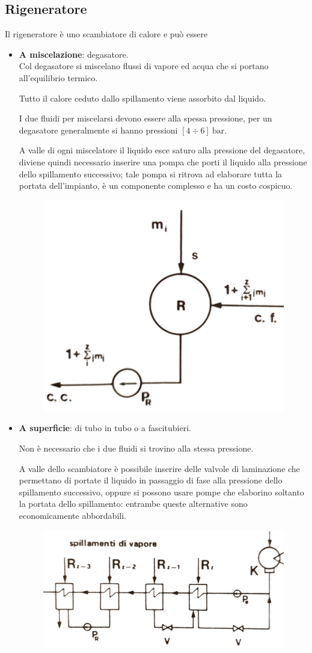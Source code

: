 \subsection{Rigeneratore}
\begin{adjustwidth}{2in}{}
	Il rigeneratore è uno scambiatore di calore e può essere 
	\begin{itemize}
		\item \textbf{A miscelazione}: degasatore.\\
		Col degasatore si miscelano flussi di vapore ed acqua che si portano all'equilibrio termico. 
		
		Tutto il calore ceduto dallo spillamento viene assorbito dal liquido. 
		
		I due fluidi per miscelarsi devono essere alla spessa pressione, per un degasatore generalmente si hanno pressioni $[4\div6]~\text{bar}$.
		
		A valle di ogni miscelatore il liquido esce saturo alla pressione del degasatore, diviene quindi necessario inserire una pompa che porti il liquido alla pressione dello spillamento successivo; tale pompa si ritrova ad elaborare tutta la portata dell'impianto, è un componente complesso e ha un costo cospicuo.
		
		\begin{figure}[H]
			\centering
			\includegraphics[width=0.3\linewidth]{immagini/miscelatore}
			\label{fig:miscelatore}
		\end{figure}
		
		
		\item \textbf{A superficie}: di tubo in tubo o a fascitubieri.
		
		Non è necessario che i due fluidi si trovino alla stessa pressione.
		
		A valle dello scambiatore è possibile inserire delle valvole di laminazione che permettano di portate il liquido in passaggio di fase alla pressione dello spillamento successivo, oppure si possono usare pompe che elaborino soltanto la portata dello spillamento: entrambe queste alternative sono economicamente abbordabili.
		
		\begin{figure}[H]
			\centering
			\includegraphics[width=0.5\linewidth]{immagini/rigeneratore}
			\label{fig:rigeneratore}
		\end{figure} 		
	\end{itemize}
	

\end{adjustwidth}
